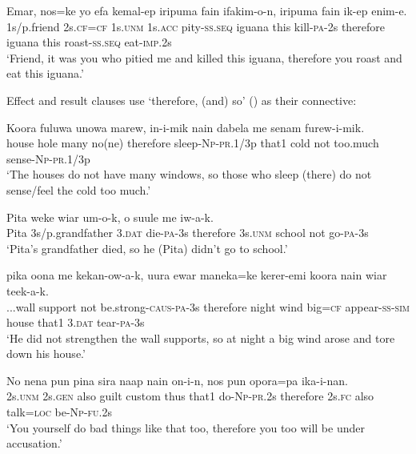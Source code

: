 \ea%
\label{ex:8:x1400}
\gll Emar,  nos=ke  yo  efa  kemal-ep  iripuma  fain ifakim-o-n,    iripuma  fain  ik-ep  enim-e.\\
1s/p.friend  2s.\textsc{cf}=\textsc{cf}  1s.\textsc{unm}  1s.\textsc{acc}  pity-\textsc{ss}.\textsc{seq}  iguana  this kill-\textsc{pa}-2s  therefore  iguana  this  roast-\textsc{ss}.\textsc{seq}  eat-\textsc{imp}.2s\\
\glt`Friend, it was you who pitied me and killed this iguana, therefore you roast and eat this iguana.'
\z


Effect and result clauses use  `therefore, (and) so' () as their connective:

\ea%
\label{ex:8:x1401}
\gll Koora  fuluwa  unowa  marew,    in-i-mik  nain dabela  me  senam  furew-i-mik.\\
house  hole  many  no(ne)  therefore  sleep-\textsc{Np}-\textsc{pr}.1/3p  that1 cold  not  too.much  sense-\textsc{Np}-\textsc{pr}.1/3p\\
\glt `The houses do not have many windows, so those who sleep (there) do not sense/feel the cold too much.'
\z


\ea%
\label{ex:8:x1402}
\gll Pita  weke  wiar  um-o-k,    o  suule me  iw-a-k. \\
Pita  3s/p.grandfather  3.\textsc{dat}  die-\textsc{pa}-3s  therefore  3s.\textsc{unm} school not  go-\textsc{pa}-3s\\
\glt`Pita's grandfather died, so he (Pita) didn't go to school.'
\z


\ea%
\label{ex:8:x1405}
\gll {\dots}pika  oona  me  kekan-ow-a-k,    uura ewar  maneka=ke  kerer-emi  koora  nain  wiar teek-a-k.\\
...wall  support  not  be.strong-\textsc{caus}-\textsc{pa}-3s  therefore  night wind  big=\textsc{cf}  appear-\textsc{ss}-\textsc{sim}  house  that1  3.\textsc{dat} tear-\textsc{pa}-3s\\
\glt`He did not strengthen the wall supports, so at night a big wind arose and tore down his house.'
\z


\ea%
\label{ex:8:x1408}
\gll No  nena  pun  pina  sira  naap  nain  on-i-n,   nos  pun  opora=pa  ika-i-nan.\\
2s.\textsc{unm}  2s.\textsc{gen}  also  guilt  custom  thus  that1  do-\textsc{Np}-\textsc{pr}.2s therefore  2s.\textsc{fc} also talk=\textsc{loc} be-\textsc{Np}-\textsc{fu}.2s\\
\glt`You yourself do bad things like that too, therefore you too will be under accusation.'
\z



